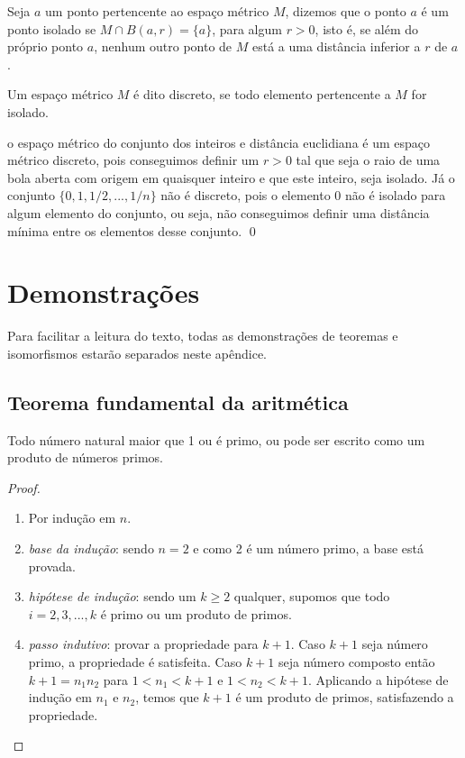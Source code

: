     Seja $a$ um ponto pertencente ao espaço métrico $M$, dizemos que o ponto $a$ é um ponto isolado se $M \cap B(a,r) = \{a\}$, para algum $r > 0$, isto é, se além do próprio ponto $a$, nenhum outro ponto de $M$ está a uma distância inferior a $r$ de $a$.

    \begin{definition}
        Um espaço métrico $M$ é dito discreto, se todo elemento pertencente a $M$ for isolado.
    \end{definition}
        
    \begin{exemplo}
        o espaço métrico do conjunto dos inteiros e distância euclidiana é um espaço métrico discreto, pois conseguimos definir um $r > 0$ tal que seja o raio de uma bola aberta com origem em quaisquer inteiro e que este inteiro, seja isolado. Já o conjunto $\{0,1,1/2,...,1/n\}$ não é discreto, pois o elemento 0 não é isolado para algum elemento do conjunto, ou seja, não conseguimos definir uma distância mínima entre os elementos desse conjunto.
    \qed
    \end{exemplo}

\chapter{Demonstrações}
\label{ap:demonstrações}
    Para facilitar a leitura do texto, todas as demonstrações de teoremas e isomorfismos estarão separados neste apêndice.

    \section{Teorema fundamental da aritmética}
        \begin{theorem}
            Todo número natural maior que 1 ou é primo, ou pode ser escrito como um produto de números primos.
        \end{theorem}
    
        \begin{proof}\ 
            \begin{enumerate}
                \item [] Por indução em $n$.
                \item \textit{base da indução}: sendo $n = 2$ e como 2 é um número primo, a base está provada.
                \item \textit{hipótese de indução}: sendo um $k \ge 2$ qualquer, supomos que todo $i = 2,3,...,k$ é primo ou um produto de primos.
                \item \textit{passo indutivo}: provar a propriedade para $k+1$. Caso $k+1$ seja número primo, a propriedade é satisfeita. Caso $k+1$ seja número composto então $k+1 = n_1 n_2$ para $1 < n_1 < k+1$ e $1 < n_2 < k+1$. Aplicando a hipótese de indução em $n_1$ e $n_2$, temos que $k+1$ é um produto de primos, satisfazendo a propriedade.
            \end{enumerate}
        \end{proof}

